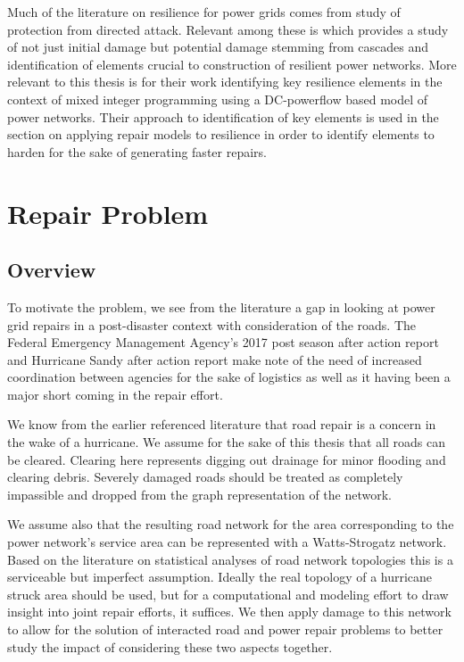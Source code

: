 \documentclass{article}
\begin{document}
		Much of the literature on resilience for power grids comes from study of protection from directed attack. Relevant among these is \cite{Deka2018} which provides a study of not just initial damage but potential damage stemming from cascades and identification of elements crucial to construction of resilient power networks. More relevant to this thesis is \cite{Salmeron2004} for their work identifying key resilience elements in the context of mixed integer programming using a DC-powerflow based model of power networks. Their approach to identification of key elements is used in the section on applying repair models to resilience in order to identify elements to harden for the sake of generating faster repairs.


	
	\section{Repair Problem}
	
	\subsection{Overview}
	To motivate the problem, we see from the literature a gap in looking at power grid repairs in a post-disaster context with consideration of the roads. The Federal Emergency Management Agency's 2017 post season after action report\cite{FEMA2017AAR}  and Hurricane Sandy after action report \cite{FEMASandyAAR} make note of the need of increased coordination between agencies for the sake of logistics as well as it having been a major short coming in the repair effort.
	
	We know from the earlier referenced literature that road repair is a concern in the wake of a hurricane. We assume for the sake of this thesis that all roads can be cleared. Clearing here represents digging out drainage for minor flooding and clearing debris. Severely damaged roads should be treated as completely impassible and dropped from the graph representation of the network.
	
	We assume also that the resulting road network for the area corresponding to the power network's service area can be represented with a Watts-Strogatz network. Based on the literature on statistical analyses of road network topologies \cite{LammerEA2006} \cite{ChanEA2011} this is a serviceable but imperfect assumption. Ideally the real topology of a hurricane struck area should be used, but for a computational and modeling effort to draw insight into joint repair efforts, it suffices. We then apply damage to this network to allow for the solution of interacted road and power repair problems to better study the impact of considering these two aspects together.
		
\end{document}
